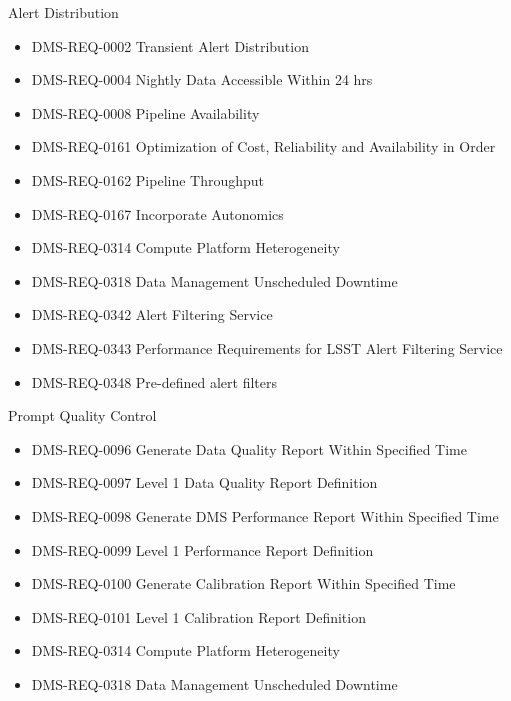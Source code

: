 Alert Distribution \begin{itemize}
\item DMS-REQ-0002 Transient Alert Distribution
\item DMS-REQ-0004 Nightly Data Accessible Within 24 hrs
\item DMS-REQ-0008 Pipeline Availability
\item DMS-REQ-0161 Optimization of Cost, Reliability and Availability in Order
\item DMS-REQ-0162 Pipeline Throughput
\item DMS-REQ-0167 Incorporate Autonomics
\item DMS-REQ-0314 Compute Platform Heterogeneity
\item DMS-REQ-0318 Data Management Unscheduled Downtime
\item DMS-REQ-0342 Alert Filtering Service
\item DMS-REQ-0343 Performance Requirements for LSST Alert Filtering Service
\item DMS-REQ-0348 Pre-defined alert filters
\end{itemize}
Prompt Quality Control \begin{itemize}
\item DMS-REQ-0096 Generate Data Quality Report Within Specified Time
\item DMS-REQ-0097 Level 1 Data Quality Report Definition
\item DMS-REQ-0098 Generate DMS Performance Report Within Specified Time
\item DMS-REQ-0099 Level 1 Performance Report Definition
\item DMS-REQ-0100 Generate Calibration Report Within Specified Time
\item DMS-REQ-0101 Level 1 Calibration Report Definition
\item DMS-REQ-0314 Compute Platform Heterogeneity
\item DMS-REQ-0318 Data Management Unscheduled Downtime
\end{itemize}
